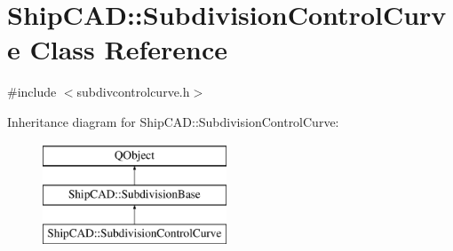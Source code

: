 \hypertarget{classShipCAD_1_1SubdivisionControlCurve}{\section{Ship\-C\-A\-D\-:\-:Subdivision\-Control\-Curve Class Reference}
\label{classShipCAD_1_1SubdivisionControlCurve}
}


{\ttfamily \#include $<$subdivcontrolcurve.\-h$>$}

Inheritance diagram for Ship\-C\-A\-D\-:\-:Subdivision\-Control\-Curve\-:\begin{figure}[H]
\begin{center}
\leavevmode
\includegraphics[height=3.000000cm]{classShipCAD_1_1SubdivisionControlCurve}
\end{center}
\end{figure}

